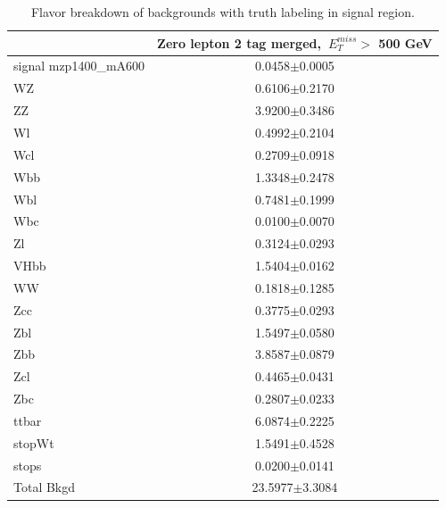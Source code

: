 \begin{table}
    \centering
    \tiny
    \begin{tabular}{l|c|}
    \cline{2-2} & \multicolumn{1}{c|}{Zero lepton 2 tag merged,~$E_{T}^{miss}$$ >$ 500 GeV} \\
    \hline
    signal mzp1400\_mA600 & 0.0458$\pm$0.0005 \\
    \hline
    WZ    & 0.6106$\pm$0.2170 \\
    ZZ    & 3.9200$\pm$0.3486 \\
    Wl    & 0.4992$\pm$0.2104 \\
    Wcl   & 0.2709$\pm$0.0918 \\
    Wbb   & 1.3348$\pm$0.2478 \\
    Wbl   & 0.7481$\pm$0.1999 \\
    Wbc   & 0.0100$\pm$0.0070 \\
    Zl    & 0.3124$\pm$0.0293 \\
    VHbb  & 1.5404$\pm$0.0162 \\
    WW    & 0.1818$\pm$0.1285 \\
    Zcc   & 0.3775$\pm$0.0293 \\
    Zbl   & 1.5497$\pm$0.0580 \\
    Zbb   & 3.8587$\pm$0.0879 \\
    Zcl   & 0.4465$\pm$0.0431 \\
    Zbc   & 0.2807$\pm$0.0233 \\
    ttbar & 6.0874$\pm$0.2225 \\
    stopWt& 1.5491$\pm$0.4528 \\
    stops & 0.0200$\pm$0.0141 \\
    \hline
    Total Bkgd & 23.5977$\pm$3.3084 \\
    \hline
    \end{tabular}
    \caption{Flavor breakdown of backgrounds with truth labeling in signal region.}
    \label{tab:fl0}
\end{table}

